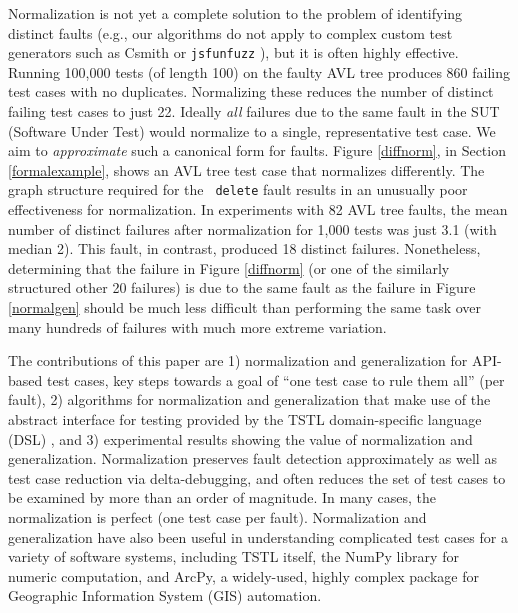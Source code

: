 Normalization is not yet a complete solution to the problem of identifying
distinct faults (e.g., our algorithms do not apply to complex custom
test generators such as Csmith \cite{csmith} or {\tt jsfunfuzz}
\cite{jsfunfuzz}), but it is often highly effective.  Running 100,000
tests (of length 100) on the faulty AVL tree produces 860 failing test
cases with no duplicates.  Normalizing these reduces the number of
distinct failing test cases to just 22.  Ideally \emph{all} failures
due to the same fault in the SUT (Software Under Test) would normalize
to a single, representative test case.  We aim to
\emph{approximate} such a canonical form for faults.  Figure \ref{diffnorm},
in Section \ref{formalexample}, shows an AVL tree test case that
normalizes differently.  The graph structure required for the {\tt
  delete} fault results in an
unusually poor effectiveness for normalization.  In experiments with 82 AVL tree faults,
the mean number of distinct failures after normalization for 1,000
tests was just 3.1 (with median 2). This fault, in contrast, produced 18
distinct failures.  Nonetheless, determining that the failure in Figure
\ref{diffnorm} (or one of the similarly structured other 20 failures)
is due to the same fault as the failure in Figure \ref{normalgen}
should be much less difficult than performing the same task over many hundreds of failures with much more extreme variation. 

The contributions of this paper are 1) normalization and
generalization for API-based test cases, key steps towards a goal of
``one test case to rule them all'' (per fault), 2) algorithms for
normalization and generalization that make use of the abstract
interface for testing provided by the TSTL \cite{tstl,NFM15,ISSTA15}
domain-specific language (DSL) \cite{Fow10}, and 3)
experimental results showing the value of normalization and
generalization.  Normalization preserves fault detection approximately
as well as test case reduction via delta-debugging, and often reduces
the set of test cases to be examined by more than an order of
magnitude. In many cases, the normalization is perfect (one test case
per fault).  Normalization and generalization have also been useful in
understanding complicated test cases for a variety of software
systems, including TSTL itself, the NumPy library for numeric
computation, and ArcPy, a widely-used, highly complex package for
Geographic Information System (GIS) automation.

